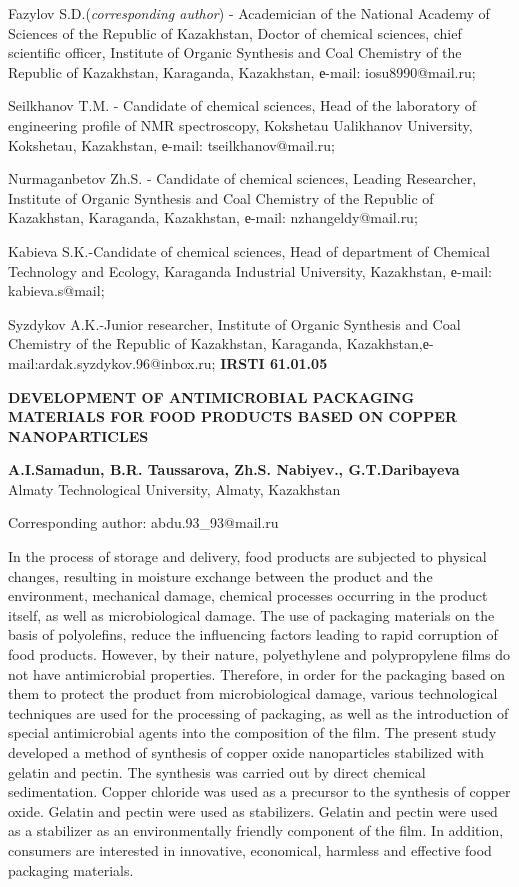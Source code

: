 Fazylov S.D.(\emph{corresponding author}) - Academician of the National
Academy of Sciences of the Republic of Kazakhstan, Doctor of chemical
sciences, chief scientific officer, Institute of Organic Synthesis and
Coal Chemistry of the Republic of Kazakhstan, Karaganda, Kazakhstan,
е-mail: iosu8990@mail.ru;

Seilkhanov T.M. - Candidate of chemical sciences, Head of the laboratory
of engineering profile of NMR spectroscopy, Kokshetau Ualikhanov
University, Kokshetau, Kazakhstan, е-mail: tseilkhanov@mail.ru;

Nurmaganbetov Zh.S. - Candidate of chemical sciences, Leading
Researcher, Institute of Organic Synthesis and Coal Chemistry of the
Republic of Kazakhstan, Karaganda, Kazakhstan, е-mail:
nzhangeldy@mail.ru;

Kabieva S.K.-Candidate of chemical sciences, Head of department of
Chemical Technology and Ecology, Karaganda Industrial University,
Kazakhstan, е-mail: kabieva.s@mail;

Syzdykov A.K.-Junior researcher, Institute of Organic Synthesis and Coal
Chemistry of the Republic of Kazakhstan, Karaganda,
Kazakhstan,е-mail:ardak.syzdykov.96@inbox.ru;\newpage
{\bfseries IRSTI 61.01.05}

{\bfseries DEVELOPMENT OF ANTIMICROBIAL PACKAGING MATERIALS FOR FOOD
PRODUCTS BASED ON COPPER NANOPARTICLES}

{\bfseries A.I.Samadun, B.R. Taussarova, Zh.S. Nabiyev., G.T.Daribayeva\\
}Almaty Technological University, Almaty, Kazakhstan

Corresponding author: abdu.93\_93@mail.ru

In the process of storage and delivery, food products are subjected to
physical changes, resulting in moisture exchange between the product and
the environment, mechanical damage, chemical processes occurring in the
product itself, as well as microbiological damage. The use of packaging
materials on the basis of polyolefins, reduce the influencing factors
leading to rapid corruption of food products. However, by their nature,
polyethylene and polypropylene films do not have antimicrobial
properties. Therefore, in order for the packaging based on them to
protect the product from microbiological damage, various technological
techniques are used for the processing of packaging, as well as the
introduction of special antimicrobial agents into the composition of the
film. The present study developed a method of synthesis of copper oxide
nanoparticles stabilized with gelatin and pectin. The synthesis was
carried out by direct chemical sedimentation. Copper chloride was used
as a precursor to the synthesis of copper oxide. Gelatin and pectin were
used as stabilizers. Gelatin and pectin were used as a stabilizer as an
environmentally friendly component of the film. In addition, consumers
are interested in innovative, economical, harmless and effective food
packaging materials.

